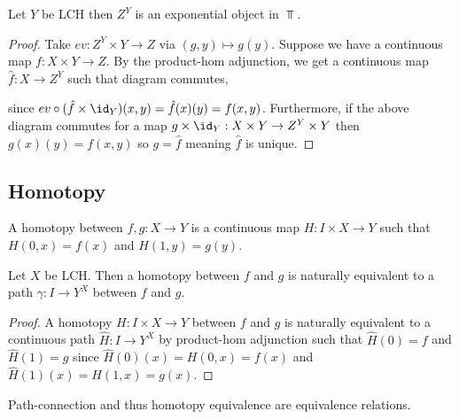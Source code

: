 \documentclass[12pt]{extarticle}
\begin{document}
\begin{proposition}
Let $Y$ be LCH then $Z^Y$ is an exponential object in $\Top$. 
\end{proposition}

\begin{proof}
Take $ev : Z^Y \times Y \to Z$ via $(g, y) \mapsto g(y)$. Suppose we have a continuous map $f : X \times Y \to Z$. By the product-hom adjunction, we get a continuous map $\hat{f} : X \to Z^Y$ such that diagram commutes,
\begin{center}
\end{center}
since $ev \circ (\hat{f} \times \id_Y)(x,y) = \hat{f}(x)(y) = f(x,y)$. Furthermore, if the above diagram commutes for a map $g \times \id_Y : X \times Y \to Z^Y \times Y$ then $g(x)(y) = f(x,y)$ so $g = \hat{f}$ meaning $\hat{f}$ is unique.  
\end{proof}

\subsection{Homotopy}

\begin{definition}
A homotopy between $f,g : X \to Y$ is a continuous map $H : I \times X \to Y$ such that $H(0, x) = f(x)$ and $H(1, y) = g(y)$.  
\end{definition}

\begin{proposition}
Let $X$ be LCH. Then a homotopy between $f$ and $g$ is naturally equivalent to a path $\gamma : I \to Y^X$ between $f$ and $g$.
\end{proposition}

\begin{proof}
A homotopy $H : I \times X \to Y$ between $f$ and $g$ is naturally equivalent to a continuous path $\hat{H} : I \to Y^X$ by product-hom adjunction such that $\hat{H}(0) = f$ and $\hat{H}(1) = g$ since $\hat{H}(0)(x) = H(0, x) = f(x)$ and $\hat{H}(1)(x) = H(1, x) = g(x)$.  
\end{proof}

\begin{proposition}
Path-connection and thus homotopy equivalence are equivalence relations.
\end{proposition}
\end{document}
